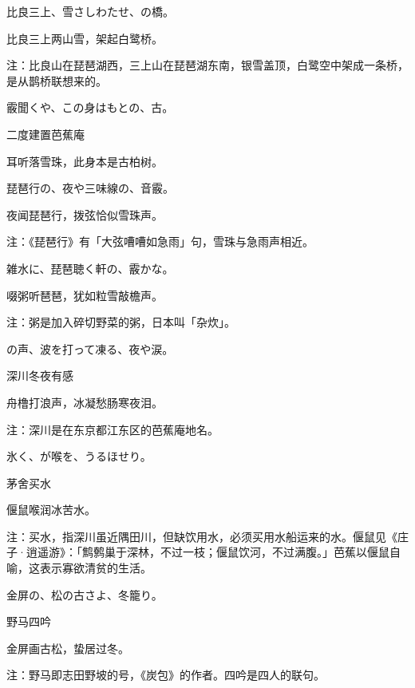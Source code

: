 \begin{haiku}
    {\FH 比良三上、雪さしわたせ、の橋。}

    {\FK 比良三上两山雪，架起白鹭桥。}

    {\FT 注：比良山在琵琶湖西，三上山在琵琶湖东南，银雪盖顶，白鹭空中架成一条桥，是从鹊桥联想来的。}
\end{haiku}

\begin{haiku}
    {\FH 霰聞くや、この身はもとの、古。}

    {\FK 二度建置芭蕉庵}

    {\FK 耳听落雪珠，此身本是古柏树。}
\end{haiku}

\begin{haiku}
    {\FH 琵琶行の、夜や三味線の、音霰。}

    {\FK 夜闻琵琶行，拨弦恰似雪珠声。}

    {\FT 注：《琵琶行》有「大弦嘈嘈如急雨」句，雪珠与急雨声相近。}
\end{haiku}

\begin{haiku}
    {\FH 雑水に、琵琶聴く軒の、霰かな。}

    {\FK 啜粥听琶琶，犹如粒雪敲檐声。}

    {\FT 注：粥是加入碎切野菜的粥，日本叫「杂炊」。}
\end{haiku}

\begin{haiku}
    {\FH {}の声、波を打って凍る、夜や涙。}

    {\FK 深川冬夜有感}

    {\FK 舟橹打浪声，冰凝愁肠寒夜泪。}

    {\FT 注：深川是在东京都江东区的芭蕉庵地名。}
\end{haiku}

\begin{haiku}
    {\FH 氷く、が喉を、うるほせり。}

    {\FK 茅舍买水}

    {\FK 偃鼠喉润冰苦水。}

    {\FT 注：买水，指深川虽近隅田川，但缺饮用水，必须买用水船运来的水。偃鼠见《庄子·逍遥游》：「鹪鹩巢于深林，不过一枝；偃鼠饮河，不过满腹。」芭蕉以偃鼠自喻，这表示寡欲清贫的生活。}
\end{haiku}

\begin{haiku}
    {\FH 金屏の、松の古さよ、冬籠り。}

    {\FK 野马四吟}

    {\FK 金屏画古松，蛰居过冬。}

    {\FT 注：野马即志田野坡的号，《炭包》的作者。四吟是四人的联句。}
\end{haiku}

